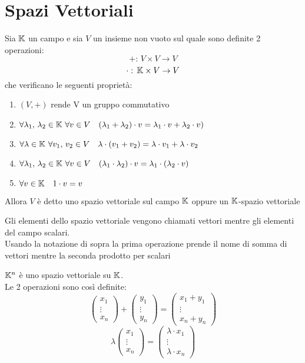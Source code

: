 %
%

\section{Spazi Vettoriali}

\begin{defn}\bianco
Sia $\mathbb{K}$ un campo e sia $V$ un insieme non vuoto sul quale sono definite 2 operazioni:
$$+:\, V \times V  \to V $$
$$\cdot:\, \mathbb{K} \times V \to V $$
che verificano le seguenti proprietà:
\begin{enumerate}
\item $(V,+)$ rende V un gruppo commutativo
\item $\forall \lambda_1, \, \lambda_2 \in \mathbb{K} \, \, \forall v \in V \quad (\lambda_1+\lambda_2)\cdot v = \lambda_1 \cdot v + \lambda_2 \cdot v)$
\item $\forall \lambda \in \mathbb{K} \, \, \forall v_1, \, v_2  \in V \quad \lambda\cdot (v_1+v_2)=\lambda\cdot v_1 + \lambda\cdot v_2$
\item $\forall \lambda_1, \, \lambda_2 \in \mathbb{K} \, \, \forall v \in V \quad (\lambda_1\cdot \lambda_2)\cdot v = \lambda_1 \cdot ( \lambda_2 \cdot v)$
\item $ \forall v \in \mathbb{K} \quad 1 \cdot v = v $
\end{enumerate}
Allora $V$ \`e detto uno spazio vettoriale sul campo $\mathbb{K}$ oppure un $\mathbb{K}$-spazio vettoriale

\end{defn}
\begin{oss}Gli elementi dello spazio vettoriale vengono chiamati vettori mentre gli elementi del campo scalari.\\
Usando la notazione di sopra la prima operazione prende il nome di somma di vettori mentre la seconda prodotto per scalari 
\end{oss}
\begin{ese} $\mathbb{K} ^ n $ \`e uno spazio vettoriale su $\mathbb{K}$.\\
Le 2 operazioni sono cos\`i definite:
$$ \begin{pmatrix}
x_1 \\
\vdots \\
x_n
\end{pmatrix} + \begin{pmatrix}
y_1 \\
\vdots \\
y_n
\end{pmatrix}= 
\begin{pmatrix}
x_1 + y_1 \\
\vdots \\
x_n+ y_n
\end{pmatrix}$$
$$ \lambda \begin{pmatrix}
x_1 \\
\vdots \\
x_n
\end{pmatrix}= \begin{pmatrix}
\lambda \cdot x_1 \\
\vdots \\
 \lambda \cdot  x_n
\end{pmatrix}$$
\end{ese}

